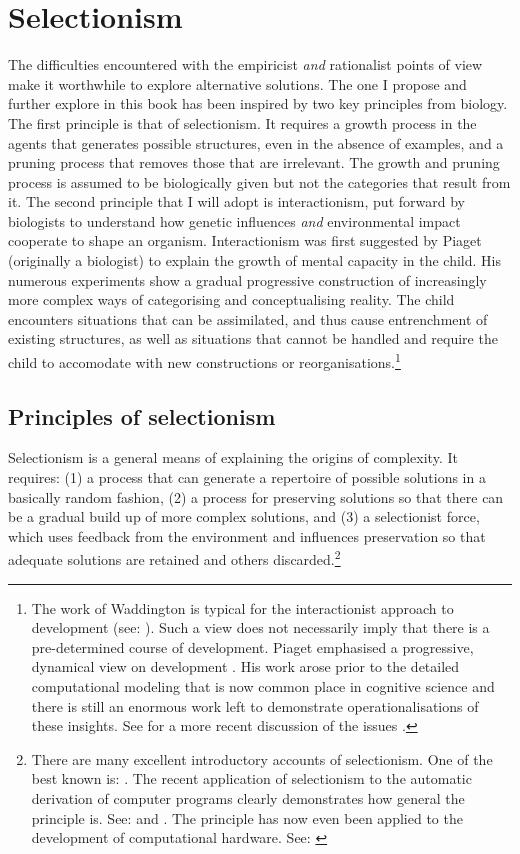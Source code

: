 \section{Selectionism}

The difficulties encountered with the empiricist
{\itshape and} rationalist points of view make it worthwhile
to explore alternative solutions. The one I propose
and further explore in this book 
has been inspired by two key principles 
from biology. The first principle is
that of selectionism. It requires 
a growth process in the agents that generates possible 
structures, even in the absence of examples, and a pruning
process that removes those
that are irrelevant. The growth and pruning
process is assumed to be biologically given
but not the categories that result from it.  
The second principle that 
I will adopt is interactionism, put forward by biologists 
to understand how genetic influences {\itshape and} environmental 
impact cooperate to shape an organism. Interactionism 
was first suggested by Piaget (originally a biologist)
to explain the growth of mental capacity in the child. 
His numerous experiments show a gradual progressive construction of 
increasingly more complex ways of categorising and 
conceptualising reality. The child encounters situations that 
can be assimilated, and thus cause entrenchment of
existing structures, as well 
as situations that cannot be handled and require 
the child to accomodate with new 
constructions or reorganisations.\footnote{
The work of Waddington is typical for the 
interactionist approach to development (see: \cite{Waddington:1975}). 
Such a view does not necessarily imply that there is 
a pre-determined course of development.
Piaget emphasised a progressive, dynamical view on 
development \cite{Piaget:1985}. 
His work arose prior to the detailed
computational modeling that is now common place in 
cognitive science and there is still an enormous 
work left to demonstrate operationalisations of these
insights. See for a more recent discussion of 
the issues \cite{Thelen:1994}.}

\subsection{Principles of selectionism}

Selectionism is a general means of explaining the origins of 
complexity. It requires: (1) a process that 
can generate a repertoire of possible solutions in a 
basically random fashion, (2) a process for preserving 
solutions so that there can be a gradual build up of 
more complex solutions, and (3) a 
selectionist force, which uses
feedback from the environment and influences preservation
so that adequate solutions are retained 
and others discarded.\footnote{
There are many excellent introductory 
accounts of selectionism. One of the best
known is: \cite{Dawkins:1995}. The 
recent application of selectionism to the automatic
derivation of computer programs clearly demonstrates
how general the principle is. See: \cite{Goldberg:1989} and \cite{Koza:1997}. 
The principle has now even been applied to 
the development of computational hardware. See: \cite{Sipper:1998}}

